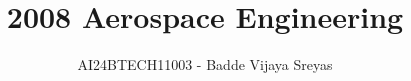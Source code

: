 \documentclass[journal]{IEEEtran}
\begin{document}

\vspace{3cm}

\title{2008 Aerospace Engineering}
\author{AI24BTECH11003 - Badde Vijaya Sreyas}
{\let\newpage\relax\maketitle}

\renewcommand{\thefigure}{\theenumi}
\renewcommand{\thetable}{\theenumi}
\setlength{\intextsep}{10pt} %


\renewcommand{\thetable}{\theenumi}
\end{document}
